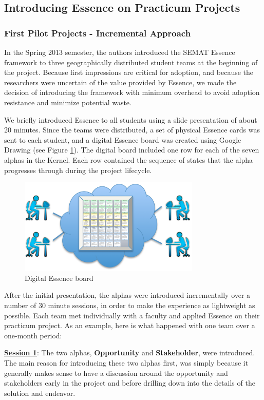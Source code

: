 \subsection{Introducing Essence on Practicum Projects}
\subsubsection{First Pilot Projects - Incremental Approach}
In the Spring 2013 semester, the authors introduced the SEMAT Essence framework to three geographically distributed student teams at the beginning of the project. Because first impressions are critical for adoption, and because the researchers were uncertain of the value provided by Essence, we made the decision of introducing the framework with minimum overhead to avoid adoption resistance and minimize potential waste.

We briefly introduced Essence to all students using a slide presentation of about 20 minutes. Since the teams were distributed, a set of physical Essence cards was sent to each student, and a digital Essence board was created using Google Drawing (see Figure \ref{DigitalEssenceBoard}). The digital board included one row for each of the seven alphas in the Kernel. Each row contained the sequence of states that the alpha progresses through during the project lifecycle.

\begin{figure}[t]
\centering
\includegraphics[width=3.40in]{project_steering_images/DigitalEssenceBoard.png}
\caption{Digital Essence board}
\label{DigitalEssenceBoard}
\end{figure}

After the initial presentation, the alphas were introduced incrementally over a number of 30 minute sessions, in order to make the experience as lightweight as possible. Each team met individually with a faculty and applied Essence on their practicum project. As an example, here is what happened with one team over a one-month period:

\underline{\textbf{Session 1}}: The two  alphas, \textbf{Opportunity} and \textbf{Stakeholder}, were introduced. The main reason for introducing these two alphas first, was simply because it generally makes sense to have a discussion around the opportunity and stakeholders early in the project and before drilling down into the details of the solution and endeavor.

